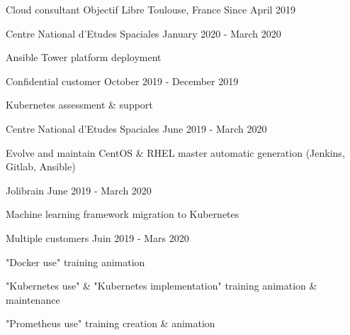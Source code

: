 

\begin{cventries}

  \cventry
    {Cloud consultant} %
    {Objectif Libre} %
    {Toulouse, France} %
    {Since April 2019} %
    {
      \begin{cvsubentries}
        \cvsubentry
          {}
          {Centre National d'Etudes Spaciales}
          {January 2020 - March 2020}
          {
            \begin{cvitems} %
              \item {Ansible Tower platform deployment}
            \end{cvitems}
          }
        \cvsubentry
          {}
          {Confidential customer}
          {October 2019 - December 2019}
          {
            \begin{cvitems} %
              \item {Kubernetes assessment \& support}
            \end{cvitems}
          }
        \cvsubentry
          {}
          {Centre National d'Etudes Spaciales}
          {June 2019 - March 2020}
          {
            \begin{cvitems} %
              \item {Evolve and maintain CentOS \& RHEL master automatic generation (Jenkins, Gitlab, Ansible)}
            \end{cvitems}
          }
        \cvsubentry
          {}
          {Jolibrain}
          {June 2019 - March 2020}
          {
            \begin{cvitems} %
              \item {Machine learning framework migration to Kubernetes}
            \end{cvitems}
          }
        \cvsubentry
          {}
          {Multiple customers}
          {Juin 2019 - Mars 2020}
          {
            \begin{cvitems} %
              \item {"Docker use" training animation}
              \item {"Kubernetes use" \& "Kubernetes implementation" training animation \& maintenance}
              \item {"Prometheus use" training creation \& animation}
            \end{cvitems}
          }
      \end{cvsubentries}
    }
  

\end{cventries}
